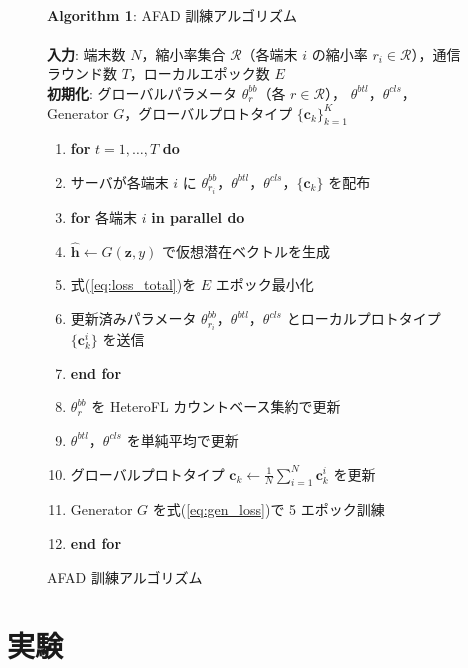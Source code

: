 \documentclass[Japanese,noauthor]{dicomopapers}
\begin{document}
\begin{figure}[htb]
\begin{small}
\noindent\hrulefill\\
\textbf{Algorithm 1}: AFAD 訓練アルゴリズム\\
\hrulefill\\
\textbf{入力}: 端末数 $N$，縮小率集合 $\mathcal{R}$（各端末 $i$ の縮小率 $r_i \in \mathcal{R}$），通信ラウンド数 $T$，ローカルエポック数 $E$\\
\textbf{初期化}: グローバルパラメータ $\theta^{bb}_{r}$（各 $r \in \mathcal{R}$），
$\theta^{btl}$，$\theta^{cls}$，Generator $G$，グローバルプロトタイプ $\{\mathbf{c}_k\}_{k=1}^{K}$\\
\noindent\hrulefill
\begin{enumerate}
  \item \textbf{for} $t = 1, \ldots, T$ \textbf{do}
  \item \quad サーバが各端末 $i$ に $\theta^{bb}_{r_i}$，$\theta^{btl}$，$\theta^{cls}$，$\{\mathbf{c}_k\}$ を配布
  \item \quad \textbf{for} 各端末 $i$ \textbf{in parallel do}
  \item \quad\quad $\hat{\mathbf{h}} \leftarrow G(\mathbf{z}, y)$ で仮想潜在ベクトルを生成
  \item \quad\quad 式(\ref{eq:loss_total})を $E$ エポック最小化
  \item \quad\quad 更新済みパラメータ $\theta^{bb}_{r_i}$，$\theta^{btl}$，$\theta^{cls}$ とローカルプロトタイプ $\{\mathbf{c}_k^i\}$ を送信
  \item \quad \textbf{end for}
  \item \quad $\theta^{bb}_{r}$ を HeteroFL カウントベース集約で更新
  \item \quad $\theta^{btl}$，$\theta^{cls}$ を単純平均で更新
  \item \quad グローバルプロトタイプ $\mathbf{c}_k \leftarrow \frac{1}{N}\sum_{i=1}^{N}\mathbf{c}_k^i$ を更新
  \item \quad Generator $G$ を式(\ref{eq:gen_loss})で 5 エポック訓練
  \item \textbf{end for}
\end{enumerate}
\hrulefill
\end{small}
\caption{AFAD 訓練アルゴリズム}
\label{alg:afad}
\end{figure}


\section{実験}
\end{document}
